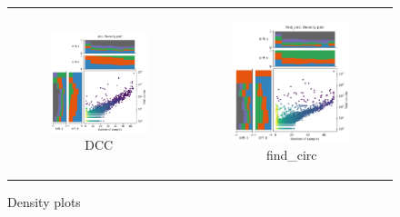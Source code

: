 \begin{figure}[ht]
\begin{tabular}{cc}
\begin{subfigure}{.5\textwidth}
            \includegraphics[width=.8\linewidth]{chapters/4_results_and_discussion/figures/detection/min_samples_0/density/dcc.png}
            \caption{DCC}
            \label{fig:detection_density_dcc}
        \end{subfigure}
         &
        \begin{subfigure}{.5\textwidth}
            \centering

            \includegraphics[width=.8\linewidth]{chapters/4_results_and_discussion/figures/detection/min_samples_0/density/find_circ.png}
            \caption{find\_circ}
            \label{fig:detection_density_find-circ}
        \end{subfigure}
    \end{tabular}
    \caption{Density plots} %
    \label{fig:detection_density}
\end{figure}

